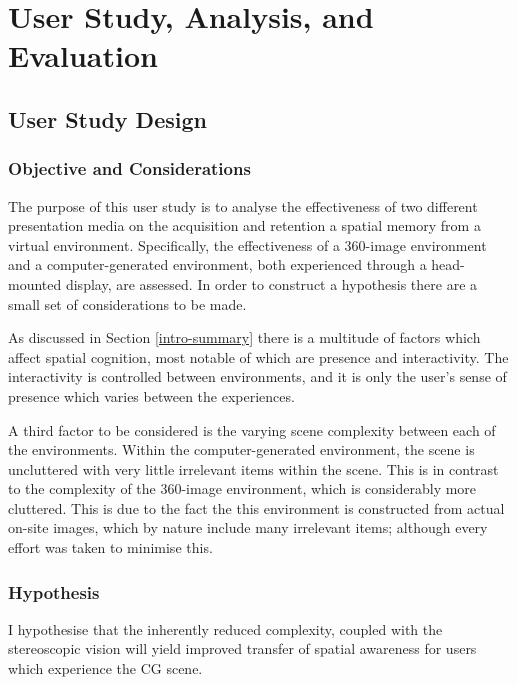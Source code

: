 \documentclass[ %
                    author={Elis Jones},
                supervisor={Dr. Kirsten Cater},
                    degree={BSc},
                     title={The Effect of Presentation Medium on Spatial Cognition},
                  subtitle={in the Virtual Environment},
                      year={2018} ]{dissertation}
\begin{document}
\chapter{User Study, Analysis, and Evaluation}\label{user-study-chapter}

\section{User Study Design}

\subsection{Objective and Considerations}
The purpose of this user study is to analyse the effectiveness of two different presentation media on the acquisition and retention a spatial memory from a virtual environment. Specifically, the effectiveness of a 360-image environment and a computer-generated environment, both experienced through a head-mounted display, are assessed. In order to construct a hypothesis there are a small set of considerations to be made.

As discussed in Section \ref{intro-summary} there is a multitude of factors which affect spatial cognition, most notable of which are presence and interactivity. The interactivity is controlled between environments, and it is only the user's sense of presence which varies between the experiences. 

A third factor to be considered is the varying scene complexity between each of the environments.  Within the computer-generated environment, the scene is uncluttered with very little irrelevant items within the scene. This is in contrast to the complexity of the 360-image environment, which is considerably more cluttered. This is due to the fact the this environment is constructed from actual on-site images, which by nature include many irrelevant items; although every effort was taken to minimise this. 

\subsection{Hypothesis}\label{hypothesis}
I hypothesise that the inherently reduced complexity, coupled with the stereoscopic vision will yield improved transfer of spatial awareness for users which experience the CG scene.
\end{document}
